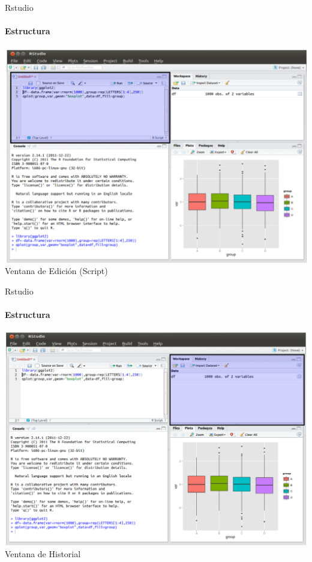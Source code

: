 \documentclass[12pt]{beamer}
\begin{document}
\begin{frame}{Rstudio}
\framesubtitle{Estructura}
\begin{center}
\includegraphics[scale=0.32]{images/rstudio2}\\
\footnotesize{Ventana de Edición (Script)}
\end{center}
\end{frame}

\begin{frame}{Rstudio}
\framesubtitle{Estructura}
\begin{center}
\includegraphics[scale=0.32]{images/rstudio3}\\
\footnotesize{Ventana de Historial}
\end{center}
\end{frame}
\end{document}
